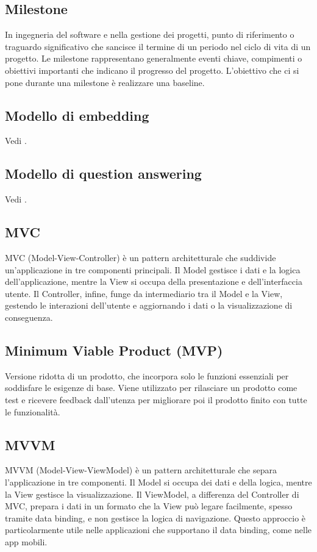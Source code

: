 \subsection*{Milestone}
In ingegneria del software e nella gestione dei progetti, punto di riferimento o traguardo significativo che sancisce il termine di un periodo nel ciclo 
di vita di un progetto. Le milestone rappresentano generalmente eventi chiave, compimenti o obiettivi importanti che indicano il progresso del progetto. 
L’obiettivo che ci si pone durante una milestone è realizzare una baseline.

\hypertarget{sec:modello_di_embedding}{}
\subsection*{Modello di embedding}
Vedi .

\hypertarget{sec:modello_di_question_answering}{}
\subsection*{Modello di question answering}
Vedi .

\hypertarget{sec:MVC}{}
\subsection*{MVC}
MVC (Model-View-Controller) è un pattern architetturale che suddivide un'applicazione in tre componenti principali.
Il Model gestisce i dati e la logica dell'applicazione, mentre la View si occupa della presentazione e dell'interfaccia utente. 
Il Controller, infine, funge da intermediario tra il Model e la View, gestendo le interazioni dell'utente e aggiornando i dati o la visualizzazione di conseguenza.

\hypertarget{sec:MVP}{}
\subsection*{Minimum Viable Product (MVP)}
Versione ridotta di un prodotto, che incorpora solo le funzioni essenziali per soddisfare le esigenze di base. Viene utilizzato per rilasciare un prodotto 
come test e ricevere feedback dall’utenza per migliorare poi il prodotto finito con tutte le funzionalità.

\hypertarget{sec:MVVM}{}
\subsection*{MVVM}
MVVM (Model-View-ViewModel) è un pattern architetturale che separa l'applicazione in tre componenti. 
Il Model si occupa dei dati e della logica, mentre la View gestisce la visualizzazione. 
Il ViewModel, a differenza del Controller di MVC, prepara i dati in un formato che la View può legare facilmente, spesso tramite data binding, e non gestisce la logica di navigazione. 
Questo approccio è particolarmente utile nelle applicazioni che supportano il data binding, come nelle app mobili.
\newpage


